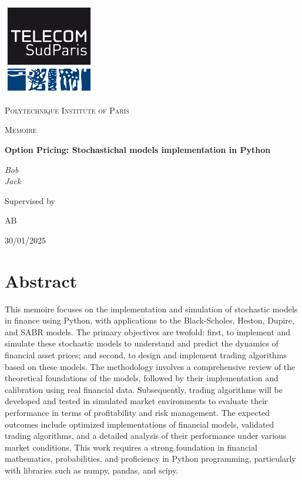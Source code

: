 \documentclass[11pt, oneside, a4paper, titlepage]{report}
\begin{document}
\begin{titlepage}
    \centering
    \includegraphics[width=0.3\textwidth]{logo-tsp.jpg}\par\vspace{1cm}
    {\scshape\LARGE Polytechnique Institute of Paris \par}
    \vspace{1cm}
    {\scshape\Large Memoire\par}
    \vspace{1.5cm}
    {\huge\bfseries Option Pricing: Stochastichal models implementation in Python \par}
    \vspace{2cm}
    {\Large\itshape Bob \\ Jack \par}
    \vfill
    Supervised by\par
    \textsc{\Large AB}
    \vfill
    {\large 30/01/2025 \par}
\end{titlepage}

\tableofcontents
\newpage

\chapter*{Abstract}
This memoire focuses on the implementation and simulation of stochastic models in finance using Python, with applications to the Black-Scholes, Heston, Dupire, and SABR models. The primary objectives are twofold: first, to implement and simulate these stochastic models to understand and predict the dynamics of financial asset prices; and second, to design and implement trading algorithms based on these models. The methodology involves a comprehensive review of the theoretical foundations of the models, followed by their implementation and calibration using real financial data. Subsequently, trading algorithms will be developed and tested in simulated market environments to evaluate their performance in terms of profitability and risk management. The expected outcomes include optimized implementations of financial models, validated trading algorithms, and a detailed analysis of their performance under various market conditions. This work requires a strong foundation in financial mathematics, probabilities, and proficiency in Python programming, particularly with libraries such as numpy, pandas, and scipy.
\end{document}
